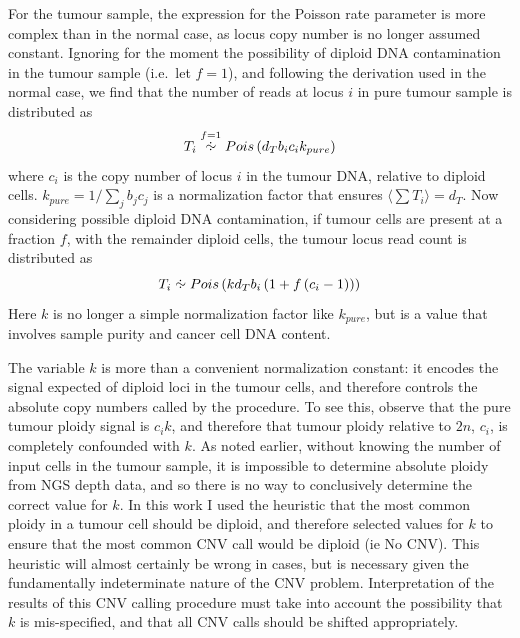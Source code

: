 \documentclass[dissertation.tex]{subfiles}
\begin{document}
For the tumour sample, the expression for the Poisson rate parameter is more complex than in the normal case, as locus copy number is no longer assumed constant.  Ignoring for the moment the possibility of diploid DNA contamination in the tumour sample (i.e.\ let $f = 1$), and following the derivation used in the normal case, we find that the number of reads at locus $i$ in pure tumour sample is distributed as
\begin{equation}
  T_i \overset{f = 1}{\approxdist} Pois\left(d_T b_i c_i k_{pure} \right)
  \label{eq:comp_cnv_Tpois_pure}
\end{equation}
where $c_i$ is the copy number of locus $i$ in the tumour DNA, relative to diploid cells.  $k_{pure} = 1/\sum_{j} b_j c_j$ is a normalization factor that ensures $\langle \sum T_i \rangle = d_T$.  Now considering possible diploid DNA contamination, if tumour cells are present at a fraction $f$, with the remainder diploid cells, the tumour locus read count is distributed as
\begin{equation}
  T_i \approxdist Pois\left(k d_T b_i \left( 1 + f \left(c_i - 1\right) \right) \right)
\label{eq:comp_cnv_Tpois_g}
\end{equation}
Here $k$ is no longer a simple normalization factor like $k_{pure}$, but is a value that involves sample purity and cancer cell DNA content.  

The variable $k$ is more than a convenient normalization constant: it encodes the signal expected of diploid loci in the tumour cells, and therefore controls the absolute copy numbers called by the procedure.  To see this, observe that the pure tumour ploidy signal is $c_i k$, and therefore that tumour ploidy relative to $2n$, $c_i$, is completely confounded with $k$.  As noted earlier, without knowing the number of input cells in the tumour sample, it is impossible to determine absolute ploidy from \gls{NGS} depth data, and so there is no way to conclusively determine the correct value for $k$.  In this work I used the heuristic that the most common ploidy in a tumour cell should be diploid, and therefore selected values for $k$ to ensure that the most common \gls{CNV} call would be diploid (ie No CNV).  This heuristic will almost certainly be wrong in cases, but is necessary given the fundamentally indeterminate nature of the \gls{CNV} problem.  Interpretation of the results of this \gls{CNV} calling procedure must take into account the possibility that $k$ is mis-specified, and that all CNV calls should be shifted appropriately.
\end{document}
